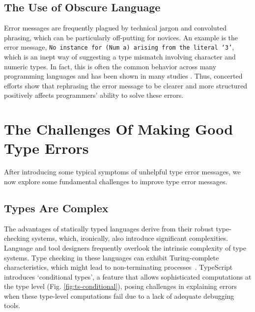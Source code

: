 \subsection*{The Use of Obscure Language}

Error messages are frequently plagued by technical jargon and convoluted phrasing, which can be particularly off-putting for novices. An example is the error message, \texttt{No instance for (Num a) arising from the literal `3'}, which is an inept way of suggesting a type mismatch involving character and numeric types. In fact, this is often the common behavior across many programming languages and has been shown in many studies \cite{Barik2017-gy, Tirronen2015-nr, Prather2017-dg}. Thus, concerted efforts \cite{Becker2016-kc, Barik2014-ib}  show that rephrasing the error message to be clearer and more structured positively affects programmers' ability to solve these errors.


\section{The Challenges Of Making Good Type Errors}
\label{sec:challenges}
After introducing some typical symptoms of unhelpful type error messages, we now explore some fundamental challenges to improve type error messages.

\subsection*{Types Are Complex}

The advantages of statically typed languages derive from their robust type-checking systems, which, ironically, also introduce significant complexities. Language and tool designers frequently overlook the intrinsic complexity of type systems.  Type checking in these languages can exhibit Turing-complete characteristics, which might lead to non-terminating processes~\cite{Wells1999-ob}. TypeScript introduces `conditional types', a feature that allows sophisticated computations at the type level (Fig. \ref{fig:ts-conditional}), posing challenges in explaining errors when these type-level computations fail due to a lack of adequate debugging tools.



